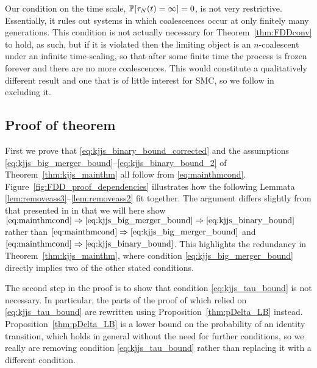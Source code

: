Our condition on the time scale, $\mathbb{P}[ \tau_N(t) = \infty ] =0$, is not very restrictive. Essentially, it rules out systems in which coalescences occur at only finitely many generations. 
This condition is not actually necessary for Theorem~\ref{thm:FDDconv} to hold, as such, but if it is violated then the limiting object is an $n$-coalescent under an infinite time-scaling, so that after some finite time the process is frozen forever and there are no more coalescences.
This would constitute a qualitatively different result and one that is of little interest for SMC, so we follow \textcite{mohle1998} in excluding it.


\subsection{Proof of theorem}

First we prove that \eqref{eq:kjjs_binary_bound_corrected} and the assumptions \eqref{eq:kjjs_big_merger_bound}--\eqref{eq:kjjs_binary_bound_2} of Theorem~\ref{thm:kjjs_mainthm} all follow from \eqref{eq:mainthmcond}.
Figure~\ref{fig:FDD_proof_dependencies} illustrates how the following Lemmata \ref{lem:removeass3}--\ref{lem:removeass2} fit together. 
The argument differs slightly from that presented in \textcite{brown2021} in that we will here show $\eqref{eq:mainthmcond} \Rightarrow \eqref{eq:kjjs_big_merger_bound} \Rightarrow \eqref{eq:kjjs_binary_bound}$ rather than $\eqref{eq:mainthmcond} \Rightarrow \eqref{eq:kjjs_big_merger_bound}$ and $\eqref{eq:mainthmcond} \Rightarrow \eqref{eq:kjjs_binary_bound}$.
This highlights the redundancy in Theorem~\ref{thm:kjjs_mainthm}, where condition \eqref{eq:kjjs_big_merger_bound} directly implies two of the other stated conditions.

The second step in the proof is to show that condition \eqref{eq:kjjs_tau_bound} is not necessary. In particular, the parts of the proof of \textcite{koskela2018} which relied on \eqref{eq:kjjs_tau_bound} are rewritten using Proposition~\ref{thm:pDelta_LB} instead. 
Proposition~\ref{thm:pDelta_LB} is a lower bound on the probability of an identity transition, which holds in general without the need for further conditions, so we really are removing condition \eqref{eq:kjjs_tau_bound} rather than replacing it with a different condition.


